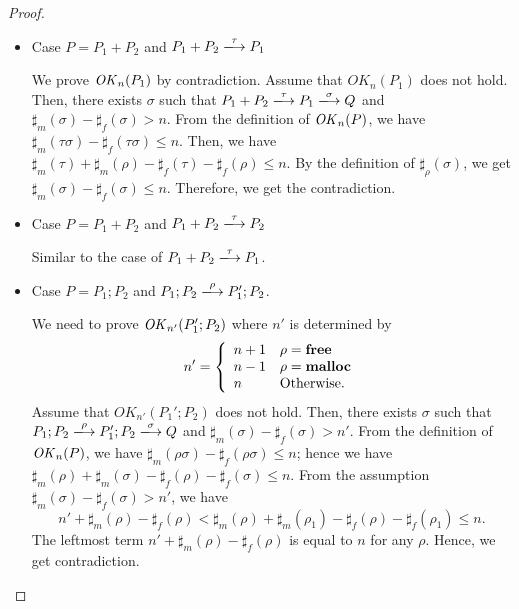 \begin{proof}
\begin{itemize}
\item Case $P = P_{1} + P_{2}$ and \(P_1 + P_2 \xlongrightarrow{\tau} P_1\)

  We prove \(\mathit{OK}_n(P_1)\) by contradiction.  Assume that
  \(OK_{n}(P_1)\) does not hold.  Then, there exists \(\sigma\) such
  that \(P_{1} + P_{2} \xlongrightarrow{\tau} P_{1}
  \xlongrightarrow{\sigma} Q\) and \(\sharp_{m}(\sigma) -
  \sharp_{f}(\sigma) > n\).  From the definition of \(\mathit{OK}_n(P)\), we
  have \(\sharp_m(\tau\sigma) -\sharp_f(\tau\sigma) \le n\). Then, we
  have \(\sharp_m(\tau) + \sharp_m(\rho) - \sharp_f(\tau)
  -\sharp_f(\rho) \le n\).  By the definition of
  \(\sharp_\rho(\sigma)\), we get \(\sharp_m(\sigma) -\sharp_f(\sigma)
  \le n\). Therefore, we get the contradiction.

\item Case $P = P_{1} + P_{2}$ and \(P_1 + P_2 \xlongrightarrow{\tau} P_2\)

  Similar to the case of \(P_1 + P_2 \xlongrightarrow{\tau} P_1\).

\item Case $P = P_{1};P_{2}$ and \(P_1;P_2 \xlongrightarrow{\rho} P_1';P_2\).

We need to prove \(\mathit{OK}_{n'}(P_1';P_2)\) where \(n'\) is determined by
\[
   n'=\left\{
   \begin{array}{ll}
     n + 1 & \rho = \mathbf{free}\\
     n - 1 & \rho = \mathbf{malloc}\\
     n & \mbox{Otherwise.}
   \end{array}
   \right.
\]
Assume that \(OK_{n'}(P_{1}';P_{2})\) does not hold. Then, there
exists \(\sigma\) such that \(P_{1};P_{2} \xlongrightarrow{\rho}
P_{1}';P_{2} \xlongrightarrow{\sigma} Q\) and \(\sharp_{m}(\sigma) -
\sharp_{f}(\sigma) > n'\).  From the definition of \(\mathit{OK}_n(P)\), we
have \( \sharp_{m}(\rho\sigma) - \sharp_{f}(\rho\sigma) \le n\); hence
we have \(\sharp_{m}(\rho) + \sharp_{m}(\sigma) - \sharp_{f}(\rho)
-\sharp_{f}(\sigma) \le n\).  From the assumption \(\sharp_{m}(\sigma)
- \sharp_{f}(\sigma) > n'\), we have 
\[
n' + \sharp_m(\rho) - \sharp_f(\rho) < \sharp_{m}(\rho) +
\sharp_{m}(\rho_1) - \sharp_{f}(\rho) -\sharp_{f}(\rho_1) \le n.
\]
The leftmost term \(n' + \sharp_m(\rho) - \sharp_f(\rho)\) is equal to
\(n\) for any \(\rho\).  Hence, we get contradiction.


\end{itemize}
\end{proof}

